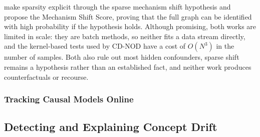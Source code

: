 \citet{perry2022causal} make sparsity explicit through the sparse mechanism shift hypothesis and propose the Mechanism Shift Score, proving
that the full graph can be identified with high probability if the hypothesis holds. Although promising, both
works are limited in scale: they are batch methods, so neither fits a data stream directly, and the kernel-based
tests used by CD-NOD have a cost of $O(N^3)$ in the number of samples. Both also rule out most hidden confounders,
sparse shift remains a hypothesis rather than an established fact, and neither work produces counterfactuals or
recourse.

\subsubsection{Tracking Causal Models Online}
\label{subsec:lr-online-causal}


\subsection{Detecting and Explaining Concept Drift}
\label{sec:lr-drift-explanation}


